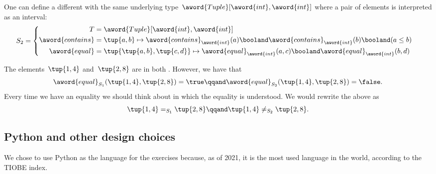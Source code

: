 One can define a different  with the same underlying type~$\aword{Tuple}[\aword{int}, \aword{int}]$ where a pair of elements is interpreted as an interval:
\begin{equation}
    S_2 =
    \begin{cases}
        \begin{aligned}
            T                & = \aword{Tuple}[\aword{int}, \aword{int}] \\
            \aword{contains} & = \tup{a,b} \mapsto
            \aword{contains}_{\aword{int}}(a)
            \booland
            \aword{contains}_{\aword{int}}(b)
            \booland
            (a\leq b) \\
            \aword{equal}    & = \tup{\tup{a,b}, \tup{c,d}}
            \mapsto
            \aword{equal}_{\aword{int}}(a,c)
            \booland
            \aword{equal}_{\aword{int}}(b,d)
        \end{aligned}
    \end{cases}
\end{equation}

The elements~$\tup{1,4}$ and~$\tup{2, 8}$ are in both .
However, we have that
\begin{equation}
    \aword{equal}_{S_1} (\tup{1,4}, \tup{2, 8}) = \true
    \qqand
    \aword{equal}_{S_2} (\tup{1,4}, \tup{2, 8}) = \false .
\end{equation}
Every time we have an equality we should think about in which  the equality is understood.
We would rewrite the above as
\begin{equation}
    \tup{1,4} =_{S_1} \tup{2, 8}
    \qqand
    \tup{1,4} \neq_{S_2} \tup{2, 8}.
\end{equation}

\subsection{Python and other design choices}

We chose to use Python as the language for the exercises because, as of 2021, it is the most used language in the world, according to the TIOBE index.

